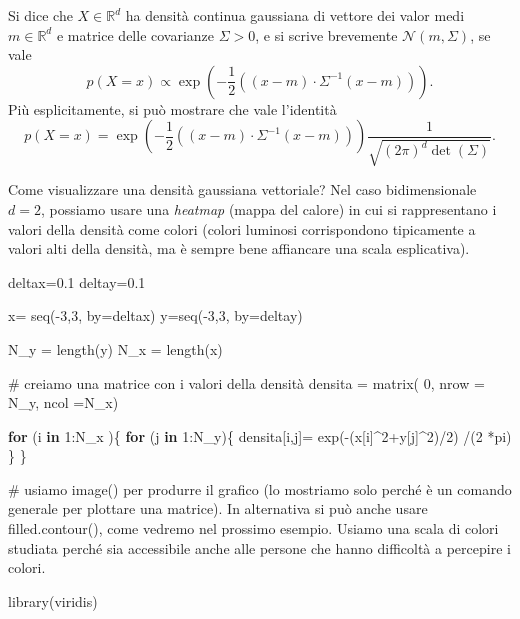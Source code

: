 \documentclass[
  italian,
  letterpaper,
]{book}
\newenvironment{Shaded}{\begin{snugshade}}{\end{snugshade}}
\newcommand{\AttributeTok}[1]{\textcolor[rgb]{0.40,0.45,0.13}{#1}}
\newcommand{\CommentTok}[1]{\textcolor[rgb]{0.37,0.37,0.37}{#1}}
\newcommand{\ControlFlowTok}[1]{\textcolor[rgb]{0.00,0.23,0.31}{\textbf{#1}}}
\newcommand{\DecValTok}[1]{\textcolor[rgb]{0.68,0.00,0.00}{#1}}
\newcommand{\FloatTok}[1]{\textcolor[rgb]{0.68,0.00,0.00}{#1}}
\newcommand{\FunctionTok}[1]{\textcolor[rgb]{0.28,0.35,0.67}{#1}}
\newcommand{\NormalTok}[1]{\textcolor[rgb]{0.00,0.23,0.31}{#1}}
\newcommand{\OtherTok}[1]{\textcolor[rgb]{0.00,0.23,0.31}{#1}}
\newcommand{\SpecialCharTok}[1]{\textcolor[rgb]{0.37,0.37,0.37}{#1}}
\newcommand{\bra}[1]{\left( #1 \right)}
\newcommand{\R}{\mathbb{R}}
\theoremstyle{definition}
\theoremstyle{remark}
\begin{document}
Si dice che \(X \in \R^d\) ha densità continua gaussiana di vettore dei
valor medi \(m \in \R^d\) e matrice delle covarianze \(\Sigma>0\), e si
scrive brevemente \(\mathcal{N}(m, \Sigma)\), se vale
\[ p(X=x ) \propto \exp\bra{ - \frac 1 2\bra{ (x-m)\cdot \Sigma^{-1} (x-m)} }.\]
Più esplicitamente, si può mostrare che vale l'identità
\[ p(X=x) =  \exp\bra{ - \frac1 2\bra{ (x-m) \cdot  \Sigma^{-1} (x-m)} } \frac{1}{\sqrt{ (2 \pi)^d \det(\Sigma)}}.\]

Come visualizzare una densità gaussiana vettoriale? Nel caso
bidimensionale \(d=2\), possiamo usare una \emph{heatmap} (mappa del
calore) in cui si rappresentano i valori della densità come colori
(colori luminosi corrispondono tipicamente a valori alti della densità,
ma è sempre bene affiancare una scala esplicativa).

\begin{Shaded}
\begin{Highlighting}[]
\NormalTok{deltax}\OtherTok{=}\FloatTok{0.1}
\NormalTok{deltay}\OtherTok{=}\FloatTok{0.1}

\NormalTok{x}\OtherTok{=} \FunctionTok{seq}\NormalTok{(}\SpecialCharTok{{-}}\DecValTok{3}\NormalTok{,}\DecValTok{3}\NormalTok{, }\AttributeTok{by=}\NormalTok{deltax)}
\NormalTok{y}\OtherTok{=}\FunctionTok{seq}\NormalTok{(}\SpecialCharTok{{-}}\DecValTok{3}\NormalTok{,}\DecValTok{3}\NormalTok{, }\AttributeTok{by=}\NormalTok{deltay)}

\NormalTok{N\_y }\OtherTok{=} \FunctionTok{length}\NormalTok{(y)}
\NormalTok{N\_x }\OtherTok{=} \FunctionTok{length}\NormalTok{(x)}

\CommentTok{\# creiamo una matrice con i valori della densità}
\NormalTok{densita }\OtherTok{=} \FunctionTok{matrix}\NormalTok{( }\DecValTok{0}\NormalTok{, }\AttributeTok{nrow =}\NormalTok{ N\_y, }\AttributeTok{ncol =}\NormalTok{N\_x)}

\ControlFlowTok{for}\NormalTok{ (i }\ControlFlowTok{in} \DecValTok{1}\SpecialCharTok{:}\NormalTok{N\_x  )\{}
  \ControlFlowTok{for}\NormalTok{ (j }\ControlFlowTok{in} \DecValTok{1}\SpecialCharTok{:}\NormalTok{N\_y)\{}
\NormalTok{    densita[i,j]}\OtherTok{=} \FunctionTok{exp}\NormalTok{(}\SpecialCharTok{{-}}\NormalTok{(x[i]}\SpecialCharTok{\^{}}\DecValTok{2}\SpecialCharTok{+}\NormalTok{y[j]}\SpecialCharTok{\^{}}\DecValTok{2}\NormalTok{)}\SpecialCharTok{/}\DecValTok{2}\NormalTok{) }\SpecialCharTok{/}\NormalTok{(}\DecValTok{2} \SpecialCharTok{*}\NormalTok{pi)}
\NormalTok{  \}}
\NormalTok{\}}

\CommentTok{\# usiamo image() per produrre il grafico (lo mostriamo solo perché è un comando generale per plottare una matrice). In alternativa si può anche usare filled.contour(), come vedremo nel prossimo esempio. Usiamo una scala di colori studiata perché sia accessibile anche alle persone che hanno difficoltà a percepire i colori.}


\FunctionTok{library}\NormalTok{(viridis)}
\end{Highlighting}
\end{Shaded}
\end{document}
